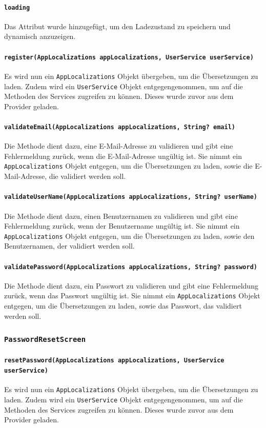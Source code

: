 \documentclass{implementierungsheft}
\begin{document}
\paragraph{\texttt{loading}}
Das Attribut wurde hinzugefügt, um den Ladezustand zu speichern und dynamisch anzuzeigen.
\paragraph{\texttt{register(AppLocalizations appLocalizations, UserService userService)}}
Es wird nun ein \texttt{AppLocalizations} Objekt übergeben, um die Übersetzungen zu laden. Zudem wird ein \texttt{UserSer\-vice} Objekt entgegengenommen, um auf die Methoden des Services zugreifen zu können. Dieses wurde zuvor aus dem Provider geladen.
\paragraph{\texttt{validateEmail(AppLocalizations appLocalizations, String? email)}}
Die Methode dient dazu, eine E-Mail-Adresse zu validieren und gibt eine Fehlermeldung zurück, wenn die E-Mail-Adresse ungültig ist. Sie nimmt ein \texttt{AppLocalizations} Objekt entgegen, um die Übersetzungen zu laden, sowie die E-Mail-Adresse, die validiert werden soll.
\paragraph*{\texttt{validateUserName(AppLocalizations appLocalizations, String? userName)}}
Die Methode dient dazu, einen Benutzernamen zu validieren und gibt eine Fehlermeldung zurück, wenn der Benutzername ungültig ist. Sie nimmt ein \texttt{AppLocalizations} Objekt entgegen, um die Übersetzungen zu laden, sowie den Benutzernamen, der validiert werden soll.
\paragraph{\texttt{validatePassword(AppLocalizations appLocalizations, String? password)}}
Die Methode dient dazu, ein Passwort zu validieren und gibt eine Fehlermeldung zurück, wenn das Passwort ungültig ist. Sie nimmt ein \texttt{AppLocalizations} Objekt entgegen, um die Übersetzungen zu laden, sowie das Passwort, das validiert werden soll.
\subsubsection{\texttt{PasswordResetScreen}}
\paragraph*{\texttt{resetPassword(AppLocalizations appLocalizations, UserService userService)}}
Es wird nun ein \texttt{AppLocalizations} Objekt übergeben, um die Übersetzungen zu laden. Zudem wird ein \texttt{UserSer\-vice} Objekt entgegengenommen, um auf die Methoden des Services zugreifen zu können. Dieses wurde zuvor aus dem Provider geladen.
\end{document}
